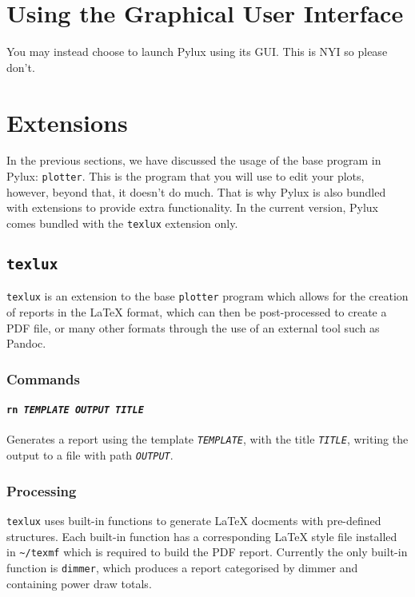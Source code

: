 \documentclass[a4paper]{article}
\begin{document}
\section{Using the Graphical User Interface}
You may instead choose to launch Pylux using its GUI. This is NYI so please 
don't.

\section{Extensions}
In the previous sections, we have discussed the usage of the base program in 
Pylux: \texttt{plotter}. This is the program that you will use to edit your
plots, however, beyond that, it doesn't do much. That is why Pylux is also 
bundled with extensions to provide extra functionality. In the current 
version, Pylux comes bundled with the \texttt{texlux} extension only.

\subsection{\texttt{texlux}}
\texttt{texlux} is an extension to the base \texttt{plotter} program which 
allows for the creation of reports in the \LaTeX{} format, which can then be 
post-processed to create a PDF file, or many other formats through the use of 
an external tool such as Pandoc.

\subsubsection{Commands}

\paragraph{\texttt{rn \textit{TEMPLATE OUTPUT TITLE}}}
Generates a report using the template \texttt{\textit{TEMPLATE}}, with the 
title \texttt{\textit{TITLE}}, writing the output to a file with path 
\texttt{\textit{OUTPUT}}.

\subsubsection{Processing}

\texttt{texlux} uses built-in functions to generate \LaTeX{} docments with 
pre-defined structures. Each built-in function has a corresponding \LaTeX{} 
style file installed in \texttt{\~{}/texmf} which is required to build 
the PDF report. Currently the only built-in function is \texttt{dimmer}, which 
produces a report categorised by dimmer and containing power draw totals.
\end{document}
